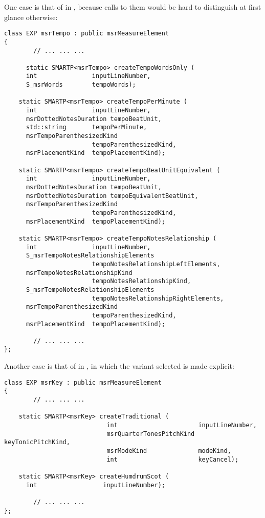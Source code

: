 One case is that of  in , because calls to them would be hard to distinguish at first glance otherwise:
\begin{lstlisting}[language=CPlusPlus]
 class EXP msrTempo : public msrMeasureElement
{
 		// ... ... ...

	  static SMARTP<msrTempo> createTempoWordsOnly (
      int               inputLineNumber,
      S_msrWords        tempoWords);

    static SMARTP<msrTempo> createTempoPerMinute (
      int               inputLineNumber,
      msrDottedNotesDuration tempoBeatUnit,
      std::string       tempoPerMinute,
      msrTempoParenthesizedKind
                        tempoParenthesizedKind,
      msrPlacementKind  tempoPlacementKind);

    static SMARTP<msrTempo> createTempoBeatUnitEquivalent (
      int               inputLineNumber,
      msrDottedNotesDuration tempoBeatUnit,
      msrDottedNotesDuration tempoEquivalentBeatUnit,
      msrTempoParenthesizedKind
                        tempoParenthesizedKind,
      msrPlacementKind  tempoPlacementKind);

    static SMARTP<msrTempo> createTempoNotesRelationship (
      int               inputLineNumber,
      S_msrTempoNotesRelationshipElements
                        tempoNotesRelationshipLeftElements,
      msrTempoNotesRelationshipKind
                        tempoNotesRelationshipKind,
      S_msrTempoNotesRelationshipElements
                        tempoNotesRelationshipRightElements,
      msrTempoParenthesizedKind
                        tempoParenthesizedKind,
      msrPlacementKind  tempoPlacementKind);

		// ... ... ...
};
\end{lstlisting}

Another case is that of  in , in which the variant selected is made explicit:
\begin{lstlisting}[language=CPlusPlus]
class EXP msrKey : public msrMeasureElement
{
		// ... ... ...

    static SMARTP<msrKey> createTraditional (
                            int                      inputLineNumber,
                            msrQuarterTonesPitchKind keyTonicPitchKind,
                            msrModeKind              modeKind,
                            int                      keyCancel);

    static SMARTP<msrKey> createHumdrumScot (
      int                  inputLineNumber);

		// ... ... ...
};
\end{lstlisting}


